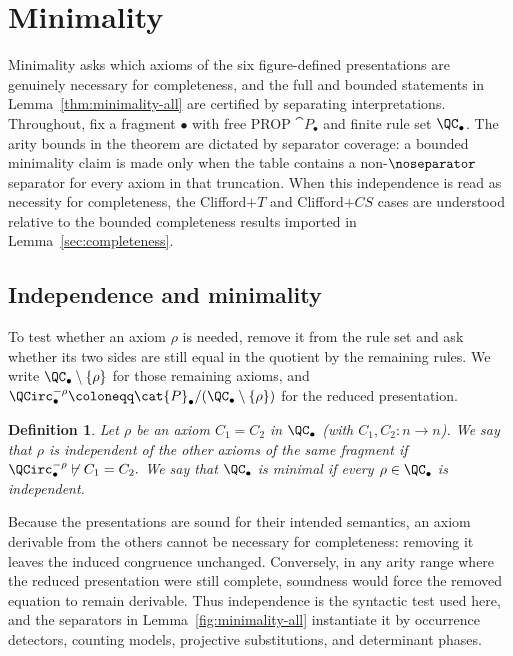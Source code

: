 \documentclass[10pt,a4paper]{article}
\newtheorem{definition}[theorem]{Definition}
\def\cref#1{Lemma~\ref{#1}}%
\begin{document}
\section{Minimality}\label{sec:minimality}

Minimality asks which axioms of the six figure-defined presentations are genuinely necessary for
completeness, and the full and bounded statements in \cref{thm:minimality-all} are certified by
separating interpretations.  Throughout, fix a fragment \(\bullet\) with free PROP
\(\cat{P}_\bullet\) and finite rule set \(\QC_\bullet\).  The arity bounds in the theorem are dictated
by separator coverage: a bounded minimality claim is made only when the table contains a
non-\(\noseparator\) separator for every axiom in that truncation.  When this independence is read as
necessity for completeness, the Clifford\(+T\) and Clifford\(+CS\) cases are understood relative to the
bounded completeness results imported in \cref{sec:completeness}.

\subsection{Independence and minimality}

To test whether an axiom \(\rho\) is needed, remove it from the rule set and ask whether its two sides
are still equal in the quotient by the remaining rules.  We write
\(\QC_\bullet\setminus\{\rho\}\) for those remaining axioms, and
\(\QCirc_\bullet^{-\rho}\coloneqq \cat{P}_\bullet/(\QC_\bullet\setminus\{\rho\})\) for the reduced
presentation.

\begin{definition}\label{def:minimality}
Let \(\rho\) be an axiom \(C_1=C_2\) in \(\QC_\bullet\) (with \(C_1,C_2:n\to n\)).
We say that \(\rho\) is independent of the other axioms of the same fragment if
\(
  \QCirc_\bullet^{-\rho}\not\vdash C_1=C_2.
\)
We say that \(\QC_\bullet\) is minimal if every \(\rho\in\QC_\bullet\) is independent.
\end{definition}

Because the presentations are sound for their intended semantics, an axiom derivable from the
others cannot be necessary for completeness: removing it leaves the induced congruence unchanged.
Conversely, in any arity range where the reduced presentation were still complete, soundness would
force the removed equation to remain derivable.  Thus independence is the syntactic test used here,
and the separators in \cref{fig:minimality-all} instantiate it by occurrence detectors, counting
models, projective substitutions, and determinant phases.
\end{document}
